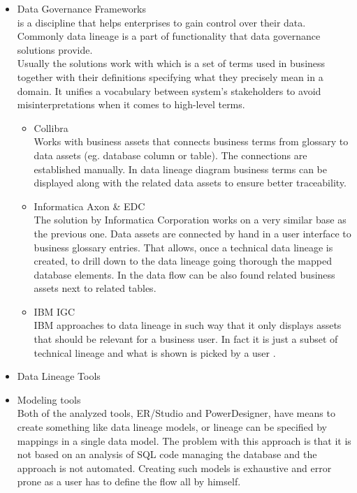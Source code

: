 \begin{itemize}
	\item Data Governance Frameworks \\ 
	 is a discipline that helps enterprises to gain control over their data. Commonly data lineage is a part of functionality that data governance solutions provide. \\
	Usually the solutions work with  which is a set of terms used in business together with their definitions specifying what they precisely mean in a domain. It unifies a vocabulary between system's stakeholders to avoid misinterpretations when it comes to high-level terms. 
	\begin{itemize}
		\item Collibra \\ 
		Works with business assets that connects business terms from glossary to data assets (eg. database column or table). The connections are established manually\cite{CollibraBusinessAssets}. In data lineage diagram business terms can be displayed along with the related data assets to ensure better traceability\cite{CollibraVisualization}.
		\item Informatica Axon \& EDC \\ 
		The solution by Informatica Corporation works on a very similar base as the previous one.
		Data assets are connected by hand in a user interface to business glossary entries\cite{InformaticaBusinessAssets}. That allows, once a technical data lineage is created, to drill down to the data lineage going thorough the mapped database elements. In the data flow can be also found related business assets next to related tables.
		\item IBM IGC \\ 
		IBM approaches to data lineage in such way that it only displays assets that should be relevant for a business user. In fact it is just a subset of technical lineage and what is shown is picked by a user \cite{IbmIgcBusinessLineage}.
	\end{itemize}
	\item Data Lineage Tools \\ 
	
	\item Modeling tools \\
	Both of the analyzed tools, ER/Studio and PowerDesigner, have means to create something like data lineage models, or lineage can be specified by mappings in a single data model. The problem with this approach is that it is not based on an analysis of SQL code managing the database and the approach is not automated. Creating such models is exhaustive and error prone as a user has to define the flow all by himself. 
\end{itemize}


